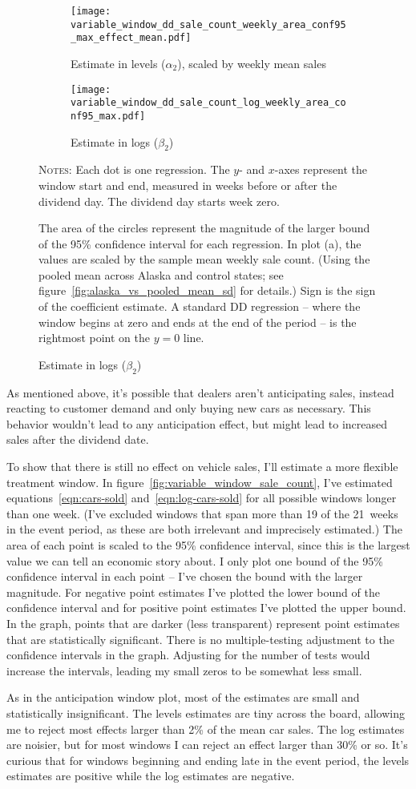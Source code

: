 \documentclass[11pt,letterpaper,oneside]{article}
\newcommand{\varWindowDDnotes}{%
Each dot is one regression.
The $y$- and $x$-axes represent the window start and end, measured in weeks before or after the dividend day.
The dividend day starts week zero.

 The area of the circles represent the magnitude of the larger bound of the 95\% confidence interval for each regression.
In plot (a), the values are scaled by the sample mean weekly sale count.
(Using the pooled mean across Alaska and control states; see figure~\ref{fig:alaska_vs_pooled_mean_sd} for details.)
Sign is the sign of the coefficient estimate. %
A standard DD regression -- where the window begins at zero and ends at the end of the period -- is the rightmost point on the $y=0$ line.
}
\begin{document}
\begin{doublespacing}
\begin{figure}[!hbtp]
    \caption{Sales count effects with varying windows}
    \label{fig:variable_window_sale_count}
    \begin{subfigure}{0.97\linewidth}
        \caption{Estimate in levels ($\alpha_2$), scaled by weekly mean sales}
        \centering
        \texttt{[image: variable\_window\_dd\_sale\_count\_weekly\_area\_conf95\_max\_effect\_mean.pdf]}
    \end{subfigure}
    \begin{subfigure}{0.97\linewidth}
        \caption{Estimate in logs ($\beta_2$)}
        \texttt{[image: variable\_window\_dd\_sale\_count\_log\_weekly\_area\_conf95\_max.pdf]}
    \end{subfigure}

    {\footnotesize
    \textsc{Notes:}
    \varWindowDDnotes
    }
\end{figure}

As mentioned above, it's possible that dealers aren't anticipating sales, instead reacting to customer demand and only buying new cars as necessary.
This behavior wouldn't lead to any anticipation effect, but might lead to increased sales after the dividend date.

To show that there is still no effect on vehicle sales, I'll estimate a more flexible treatment window.
In figure~\ref{fig:variable_window_sale_count}, I've estimated equations~\ref{eqn:cars-sold} and~\ref{eqn:log-cars-sold} for all possible windows longer than one week.
(I've excluded windows that span more than 19 of the 21~weeks in the event period, as these are both irrelevant and imprecisely estimated.)
The area of each point is scaled to the 95\% confidence interval, since this is the largest value we can tell an economic story about.
I only plot one bound of the 95\% confidence interval in each point -- I've chosen the bound with the larger magnitude.
For negative point estimates I've plotted the lower bound of the confidence interval and for positive point estimates I've plotted the upper bound.
In the graph, points that are darker (less transparent) represent point estimates that are statistically significant.
There is no multiple\hyp{}testing adjustment to the confidence intervals in the graph.
Adjusting for the number of tests would increase the intervals, leading my small zeros to be somewhat less small.

As in the anticipation window plot, most of the estimates are small and statistically insignificant.
The levels estimates are tiny across the board, allowing me to reject most effects larger than 2\% of the mean car sales.
The log estimates are noisier, but for most windows I can reject an effect larger than 30\% or so.
It's curious that for windows beginning and ending late in the event period, the levels estimates are positive while the log estimates are negative.


\end{doublespacing}
\end{document}
